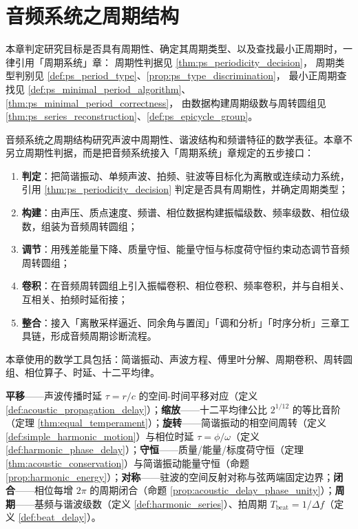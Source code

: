 \chapter{音频系统之周期结构}

\begin{remark}[本章目标的周期性判定（引用）]\label{rem:audio_ps_hook}
本章判定研究目标是否具有周期性、确定其周期类型、以及查找最小正周期时，一律引用「周期系统」章：
周期性判据见 \cref{thm:ps_periodicity_decision}，
周期类型判别见 \cref{def:ps_period_type}、\cref{prop:ps_type_discrimination}，
最小正周期查找见 \cref{def:ps_minimal_period_algorithm}、\cref{thm:ps_minimal_period_correctness}，
由数据构建周期级数与周转圆组见 \cref{thm:ps_series_reconstruction}、\cref{def:ps_epicycle_group}。
\end{remark}

\begin{remark}\label{rem:audio_five_steps_positioning}
音频系统之周期结构研究声波中周期性、谐波结构和频谱特征的数学表征。本章不另立周期性判据，而是把音频系统接入「周期系统」章规定的五步接口：
\begin{enumerate}[label=(\arabic*)]
    \item \textbf{判定}：把简谐振动、单频声波、拍频、驻波等目标化为离散或连续动力系统，引用 \cref{thm:ps_periodicity_decision} 判定是否具有周期性，并确定周期类型；
    \item \textbf{构建}：由声压、质点速度、频谱、相位数据构建振幅级数、频率级数、相位级数，组装为音频周转圆组；
    \item \textbf{调节}：用残差能量下降、质量守恒、能量守恒与标度荷守恒约束动态调节音频周转圆组；
    \item \textbf{卷积}：在音频周转圆组上引入振幅卷积、相位卷积、频率卷积，并与自相关、互相关、拍频时延衔接；
    \item \textbf{整合}：接入「离散采样逼近、同余角与置闰」「调和分析」「时序分析」三章工具链，形成音频周期诊断流程。
\end{enumerate}
本章使用的数学工具包括：简谐振动、声波方程、傅里叶分解、周期卷积、周转圆组、相位算子、时延、十二平均律。
\end{remark}

\begin{remark}[本章七主题导引]\label{rem:audio_seven_themes}
\textbf{平移}——声波传播时延 $\tau = r/c$ 的空间-时间平移对应（定义 \ref{def:acoustic_propagation_delay}）；\textbf{缩放}——十二平均律公比 $2^{1/12}$ 的等比音阶（定理 \ref{thm:equal_temperament}）；\textbf{旋转}——简谐振动的相空间周转（定义 \ref{def:simple_harmonic_motion}）与相位时延 $\tau = \phi/\omega$（定义 \ref{def:harmonic_phase_delay}）；\textbf{守恒}——质量/能量/标度荷守恒（定理 \ref{thm:acoustic_conservation}）与简谐振动能量守恒（命题 \ref{prop:harmonic_energy}）；\textbf{对称}——驻波的空间反射对称与弦两端固定边界；\textbf{闭合}——相位每增 $2\pi$ 的周期闭合（命题 \ref{prop:acoustic_delay_phase_unity}）；\textbf{周期}——基频与谐波级数（定义 \ref{def:harmonic_series}）、拍周期 $T_{\text{beat}} = 1/\Delta f$（定义 \ref{def:beat_delay}）。
\end{remark}

